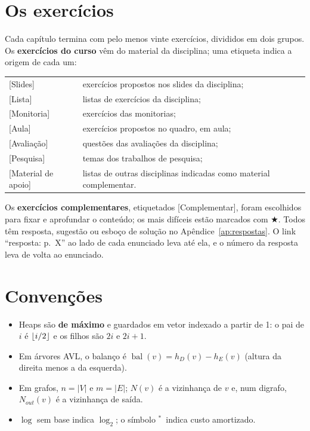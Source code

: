 \documentclass[11pt,a4paper,oneside,openany]{book}
\newcommand{\bal}{\operatorname{bal}}
\DeclarePairedDelimiter{\floor}{\lfloor}{\rfloor}
\newcommand{\am}{$^{*}$}   %
\theoremstyle{plain}
\theoremstyle{definition}
\theoremstyle{remark}
\newcounter{exerc}[chapter]
\newcommand{\estrela}{$\bigstar$}
\numberwithin{equation}{chapter}
\begin{document}
\section*{Os exercícios}
Cada capítulo termina com pelo menos vinte exercícios, divididos em dois grupos. Os \textbf{exercícios do curso} vêm do material da disciplina; uma etiqueta indica a origem de cada um:
\begin{center}\small
\begin{tabular}{@{}ll@{}}
\textsf{[Slides]} & exercícios propostos nos slides da disciplina;\\
\textsf{[Lista]} & listas de exercícios da disciplina;\\
\textsf{[Monitoria]} & exercícios das monitorias;\\
\textsf{[Aula]} & exercícios propostos no quadro, em aula;\\
\textsf{[Avaliação]} & questões das avaliações da disciplina;\\
\textsf{[Pesquisa]} & temas dos trabalhos de pesquisa;\\
\textsf{[Material de apoio]} & listas de outras disciplinas indicadas como material complementar.\\
\end{tabular}
\end{center}
Os \textbf{exercícios complementares}, etiquetados \textsf{[Complementar]}, foram escolhidos para fixar e aprofundar o conteúdo; os mais difíceis estão marcados com \estrela. Todos têm resposta, sugestão ou esboço de solução no Apêndice~\ref{ap:respostas}. O link ``resposta: p.~X'' ao lado de cada enunciado leva até ela, e o número da resposta leva de volta ao enunciado.

\section*{Convenções}
\begin{itemize}
  \item Heaps são \textbf{de máximo} e guardados em vetor indexado a partir de 1: o pai de $i$ é $\floor{i/2}$ e os filhos são $2i$ e $2i+1$.
  \item Em árvores AVL, o balanço é $\bal(v)=h_D(v)-h_E(v)$ (altura da direita menos a da esquerda).
  \item Em grafos, $n=|V|$ e $m=|E|$; $N(v)$ é a vizinhança de $v$ e, num digrafo, $N_{out}(v)$ é a vizinhança de saída.
  \item $\log$ sem base indica $\log_2$; o símbolo \am\ indica custo amortizado.
\end{itemize}
\end{document}
